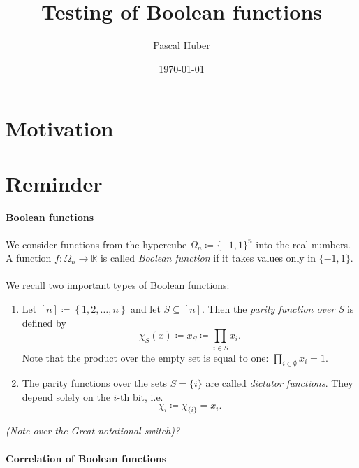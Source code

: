 \documentclass[a4paper]{article}
\newcommand{\real}{\mathbb{R}}
\newcommand{\nset}{[n]}
\theoremstyle{plain}
\theoremstyle{definition}
\begin{document}
\title{Testing of Boolean functions}
\author{Pascal Huber}
\date{\today}
\maketitle

\section{Motivation}
\label{sec:motivation}

\section{Reminder}
\label{sec:reminder}

\paragraph{Boolean functions}
\label{sec:boolean-functions}

We consider functions from the hypercube \(\Omega_n \coloneqq
\{-1,1\}^n\) into the real numbers. A function \(f: \Omega_n
\rightarrow \real\) is called \emph{Boolean function} if it takes values only in
\(\{-1,1\}\). \\\\
We recall two important types of Boolean functions:\\
\begin{enumerate}
\item Let \(\nset \coloneqq \left\{1,2, \dots, n\right\}\) and let
  \(S\subseteq \nset\). Then the \emph{parity function over S} is
  defined by 
  \[ \chi_S(x) \coloneqq x_S \coloneqq \prod_{i \in S} x_i. \]
  Note that the product over the empty set is equal to one: \(\prod_{i
    \in \emptyset} x_i = 1\). 

\item The parity functions over the sets \(S = \{i\}\) are called
  \emph{dictator functions}. They depend solely on the \(i\)-th bit,
  i.e. 
  \[\chi_i \coloneqq \chi_{\{i\}} = x_i.\] 
\end{enumerate}

\noindent\emph{(Note over the Great notational switch)?}
\\

\paragraph{Correlation of Boolean functions}
\label{sec:corr-bool-funct}
\end{document}
